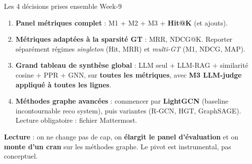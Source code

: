 \documentclass[aspectratio=169,10pt]{beamer}
\newcommand{\keybox}[1]{%
  \begin{center}
  \colorbox{accentsoft}{\parbox{0.92\linewidth}{\centering #1}}
  \end{center}}
\begin{document}
\begin{frame}{Les 4 décisions prises ensemble Week-9}
  \footnotesize
  \vspace{0.3em}
  \begin{enumerate}
    \item \textbf{Panel métriques complet} : M1 + M2 + M3 + \textbf{Hit@K} (et ajouts).
    \item \textbf{Métriques adaptées à la sparsité GT} : MRR, NDCG@K. Reporter
    séparément régimes \textit{singleton} (Hit, MRR) et \textit{multi-GT} (M1, NDCG, MAP).
    \item \textbf{Grand tableau de synthèse global} : LLM seul $+$ LLM-RAG $+$
    similarité cosine $+$ PPR $+$ GNN, sur \textbf{toutes les métriques},
    avec \textbf{M3 LLM-judge appliqué à toutes les lignes}.
    \item \textbf{Méthodes graphe avancées} : commencer par \textbf{LightGCN}
    (baseline incontournable reco system), puis variantes (R-GCN, HGT, GraphSAGE).
    Lecture obligatoire : fichier Mattermost.
  \end{enumerate}

  \vspace{0.6em}
  \keybox{\textbf{Lecture} : on ne change pas de cap, on \textbf{élargit le panel
  d'évaluation} et on \textbf{monte d'un cran} sur les méthodes graphe.
  Le pivot est instrumental, pas conceptuel.}
\end{frame}
\end{document}
